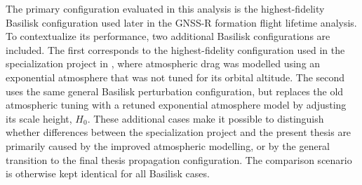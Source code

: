 The primary configuration evaluated in this analysis is the highest-fidelity Basilisk configuration used later in the GNSS-R formation flight lifetime analysis. To contextualize its performance, two additional Basilisk configurations are included. The first corresponds to the highest-fidelity configuration used in the specialization project in \cite{hystad2025}, where atmospheric drag was modelled using an exponential atmosphere that was not tuned for its orbital altitude. The second uses the same general Basilisk perturbation configuration, but replaces the old atmospheric tuning with a retuned exponential atmosphere model by adjusting its scale height, $H_0$. These additional cases make it possible to distinguish whether differences between the specialization project and the present thesis are primarily caused by the improved atmospheric modelling, or by the general transition to the final thesis propagation configuration. The comparison scenario is otherwise kept identical for all Basilisk cases.

